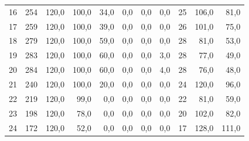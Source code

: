\documentclass[10pt,letterpaper]{article}
\begin{document}
\begin{table}[H]
\begin{tabular}{rrrrrrrrrrr}
16 & 254 & 120,0 & 100,0 & 34,0 & 0,0 & 0,0 & 0,0 & 25 & 106,0 & 81,0 \\
17 & 259 & 120,0 & 100,0 & 39,0 & 0,0 & 0,0 & 0,0 & 26 & 101,0 & 75,0 \\
18 & 279 & 120,0 & 100,0 & 59,0 & 0,0 & 0,0 & 0,0 & 28 & 81,0 & 53,0 \\
19 & 283 & 120,0 & 100,0 & 60,0 & 0,0 & 0,0 & 3,0 & 28 & 77,0 & 49,0 \\
20 & 284 & 120,0 & 100,0 & 60,0 & 0,0 & 0,0 & 4,0 & 28 & 76,0 & 48,0 \\
21 & 240 & 120,0 & 100,0 & 20,0 & 0,0 & 0,0 & 0,0 & 24 & 120,0 & 96,0 \\
22 & 219 & 120,0 & 99,0 & 0,0 & 0,0 & 0,0 & 0,0 & 22 & 81,0 & 59,0 \\
23 & 198 & 120,0 & 78,0 & 0,0 & 0,0 & 0,0 & 0,0 & 20 & 102,0 & 82,0 \\
24 & 172 & 120,0 & 52,0 & 0,0 & 0,0 & 0,0 & 0,0 & 17 & 128,0 & 111,0 \\
\bottomrule
\end{tabular}
\end{table}
\end{document}
